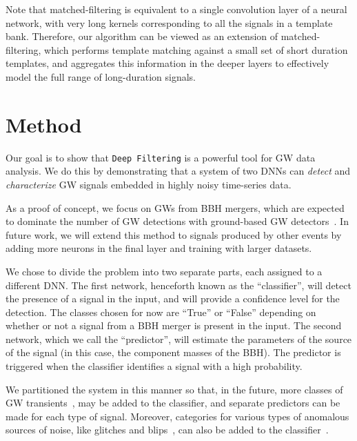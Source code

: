 \documentclass[aps,prd,%
amsmath,floats,floatfix, twocolumn, superscriptaddress,nofootinbib,showpacs]{revtex4-1}
\begin{document}
Note that matched-filtering is equivalent to a single convolution layer of a neural network, with very long kernels corresponding to all the signals in a template bank. Therefore, our algorithm can be viewed as an extension of matched-filtering, which performs template matching against a small set of short duration templates, and aggregates this information in the deeper layers to effectively model the full range of long-duration signals.


\section{Method}
\label{meth}

Our goal is to show that \texttt{Deep Filtering} is a powerful tool for GW data analysis. We do this by demonstrating that a system of two DNNs can \textit{detect} and \textit{characterize} GW signals embedded in highly noisy time-series data.

As a proof of concept, we focus on GWs from BBH mergers, which are expected to dominate the number of GW detections with ground-based GW detectors~\cite{bel:2016Na,Belc:2015BB,bbhswithligo:2016}. In future work, we will extend this method to signals produced by other events by adding more neurons in the final layer and training with larger datasets.

We chose to divide the problem into two separate parts, each assigned to a different DNN. The first network, henceforth known as the ``classifier'', will detect the presence of a signal in the input, and will provide a confidence level for the detection. The classes chosen for now are ``True'' or ``False'' depending on whether or not a signal from a BBH merger is present in the input. The second network, which we call the ``predictor'', will estimate the parameters of the source of the signal (in this case, the component masses of the BBH). The predictor is triggered when the classifier identifies a signal with a high probability. 

We partitioned the system in this manner so that, in the future, more classes of GW transients~\cite{2016PhRvD..93l4062H,ETL:2012CQGra,2014CQGra..31a5005M}, may be added to the classifier, and separate predictors can be made for each type of signal. Moreover, categories for various types of anomalous sources of noise, like glitches and blips~\cite{GravitySpy,corn:2015CQGra}, can also be added to the classifier~\cite{Geo:2017b}.
\end{document}
